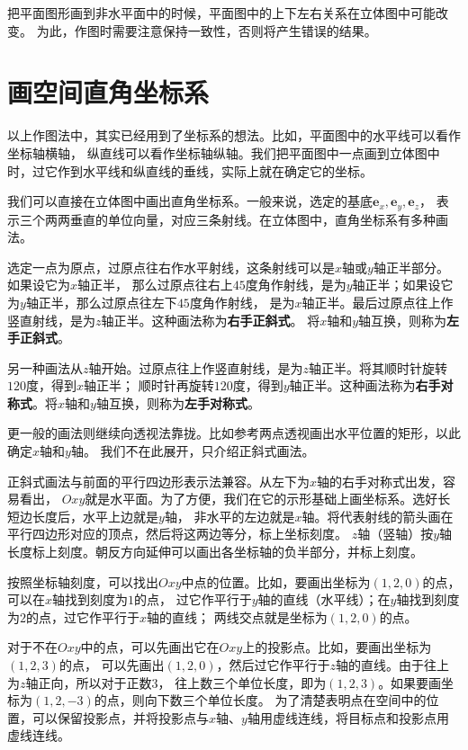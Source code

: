 \documentclass[12pt,UTF8]{ctexbook}
\begin{document}
\begin{appendix}
把平面图形画到非水平面中的时候，平面图中的上下左右关系在立体图中可能改变。
为此，作图时需要注意保持一致性，否则将产生错误的结果。

\section{画空间直角坐标系}

以上作图法中，其实已经用到了坐标系的想法。比如，平面图中的水平线可以看作坐标轴横轴，
纵直线可以看作坐标轴纵轴。我们把平面图中一点画到立体图中时，过它作到水平线和纵直线的垂线，实际上就在确定它的坐标。

我们可以直接在立体图中画出直角坐标系。一般来说，选定的基底$\mathbf{e}_x,\mathbf{e}_y,\mathbf{e}_z$，
表示三个两两垂直的单位向量，对应三条射线。在立体图中，直角坐标系有多种画法。

选定一点为原点，过原点往右作水平射线，这条射线可以是$x$轴或$y$轴正半部分。如果设它为$x$轴正半，
那么过原点往右上$45$度角作射线，是为$y$轴正半；如果设它为$y$轴正半，那么过原点往左下$45$度角作射线，
是为$x$轴正半。最后过原点往上作竖直射线，是为$z$轴正半。这种画法称为\textbf{右手正斜式}。
将$x$轴和$y$轴互换，则称为\textbf{左手正斜式}。

另一种画法从$z$轴开始。过原点往上作竖直射线，是为$z$轴正半。将其顺时针旋转$120$度，得到$x$轴正半；
顺时针再旋转$120$度，得到$y$轴正半。这种画法称为\textbf{右手对称式}。将$x$轴和$y$轴互换，则称为\textbf{左手对称式}。

更一般的画法则继续向透视法靠拢。比如参考两点透视画出水平位置的矩形，以此确定$x$轴和$y$轴。
我们不在此展开，只介绍正斜式画法。

正斜式画法与前面的平行四边形表示法兼容。从左下为$x$轴的右手对称式出发，容易看出，
$Oxy$就是水平面。为了方便，我们在它的示形基础上画坐标系。选好长短边长度后，水平上边就是$y$轴，
非水平的左边就是$x$轴。将代表射线的箭头画在平行四边形对应的顶点，然后将这两边等分，标上坐标刻度。
$z$轴（竖轴）按$y$轴长度标上刻度。朝反方向延伸可以画出各坐标轴的负半部分，并标上刻度。

按照坐标轴刻度，可以找出$Oxy$中点的位置。比如，要画出坐标为$(1,2,0)$的点，可以在$x$轴找到刻度为$1$的点，
过它作平行于$y$轴的直线（水平线）；在$y$轴找到刻度为$2$的点，过它作平行于$x$轴的直线；
两线交点就是坐标为$(1,2,0)$的点。

对于不在$Oxy$中的点，可以先画出它在$Oxy$上的投影点。比如，要画出坐标为$(1,2,3)$的点，
可以先画出$(1,2,0)$，然后过它作平行于$z$轴的直线。由于往上为$z$轴正向，所以对于正数$3$，
往上数三个单位长度，即为$(1,2,3)$。如果要画坐标为$(1,2,-3)$的点，则向下数三个单位长度。
为了清楚表明点在空间中的位置，可以保留投影点，并将投影点与$x$轴、$y$轴用虚线连线，将目标点和投影点用虚线连线。


\end{appendix}
\end{document}
